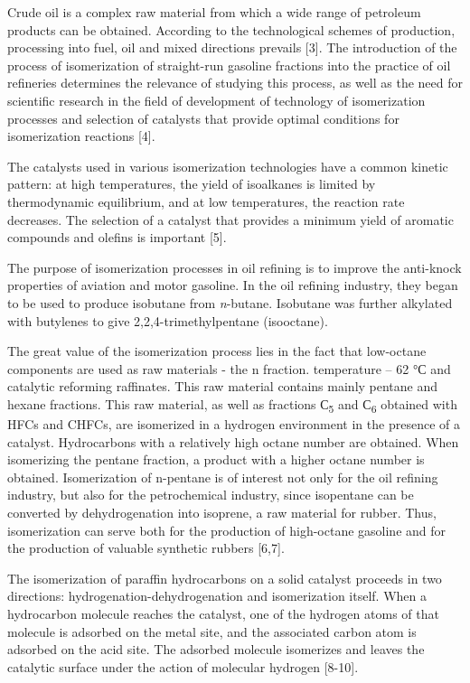 Crude oil is a complex raw material from which a wide range of petroleum
products can be obtained. According to the technological schemes of
production, processing into fuel, oil and mixed directions prevails
{[}3{]}. The introduction of the process of isomerization of
straight-run gasoline fractions into the practice of oil refineries
determines the relevance of studying this process, as well as the need
for scientific research in the field of development of technology of
isomerization processes and selection of catalysts that provide optimal
conditions for isomerization reactions {[}4{]}.

The catalysts used in various isomerization technologies have a common
kinetic pattern: at high temperatures, the yield of isoalkanes is
limited by thermodynamic equilibrium, and at low temperatures, the
reaction rate decreases. The selection of a catalyst that provides a
minimum yield of aromatic compounds and olefins is important {[}5{]}.

The purpose of isomerization processes in oil refining is to improve the
anti-knock properties of aviation and motor gasoline. In the oil
refining industry, they began to be used to produce isobutane from
\emph{n}-butane. Isobutane was further alkylated with butylenes to give
2,2,4-trimethylpentane (isooctane).

The great value of the isomerization process lies in the fact that
low-octane components are used as raw materials - the n fraction.
temperature -- 62 °С and catalytic reforming raffinates. This raw
material contains mainly pentane and hexane fractions. This raw
material, as well as fractions С\textsubscript{5} and С\textsubscript{6}
obtained with HFCs and CHFCs, are isomerized in a hydrogen environment
in the presence of a catalyst. Hydrocarbons with a relatively high
octane number are obtained. When isomerizing the pentane fraction, a
product with a higher octane number is obtained. Isomerization of
n-pentane is of interest not only for the oil refining industry, but
also for the petrochemical industry, since isopentane can be converted
by dehydrogenation into isoprene, a raw material for rubber. Thus,
isomerization can serve both for the production of high-octane gasoline
and for the production of valuable synthetic rubbers {[}6,7{]}.

The isomerization of paraffin hydrocarbons on a solid catalyst proceeds
in two directions: hydrogenation-dehydrogenation and isomerization
itself. When a hydrocarbon molecule reaches the catalyst, one of the
hydrogen atoms of that molecule is adsorbed on the metal site, and the
associated carbon atom is adsorbed on the acid site. The adsorbed
molecule isomerizes and leaves the catalytic surface under the action of
molecular hydrogen {[}8-10{]}.

